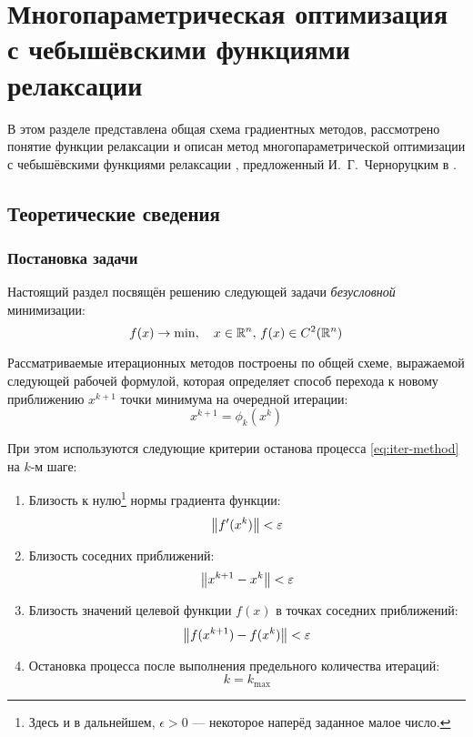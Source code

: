 \section{Многопараметрическая оптимизация\\
  с чебышёвскими функциями релаксации}
\label{sec:relch}

В этом разделе представлена общая схема градиентных методов,
рассмотрено понятие функции релаксации и описан метод
многопараметрической оптимизации с чебышёвскими функциями релаксации
\relch{}, предложенный И. Г. Черноруцким в
\cite{chernorutsky04}.

\subsection{Теоретические сведения}

\subsubsection{Постановка задачи}

Настоящий раздел посвящён решению следующей задачи \emph{безусловной}
минимизации:
\begin{equation}
  \label{eq:optim-problem-form}
  f(x) \to \min,\quad x \in \mathbb{R}^n,\, f(x) \in C^2(\mathbb{R}^n)
\end{equation}

Рассматриваемые итерационных методов построены по общей схеме,
выражаемой следующей рабочей формулой, которая определяет способ
перехода к новому приближению $x^{k+1}$ точки минимума на очередной
итерации:
\begin{equation}
  \label{eq:iter-method}
  x^{k+1} = \phi_k(x^k)
\end{equation}

При этом используются следующие критерии останова процесса
\eqref{eq:iter-method} на $k$-м шаге:
\begin{enumerate}
\item Близость к нулю\footnote{Здесь и в дальнейшем, $\epsilon>0$ —
    некоторое наперёд заданное малое число.} нормы градиента функции:
  \begin{equation*}
  \left \lVert{f'(x^k)}\right \rVert < \varepsilon
\end{equation*}

\item Близость соседних приближений:
  \begin{equation*}
    \left \lVert{x^{k+1}-x^k}\right \rVert < \varepsilon
  \end{equation*}
  
\item Близость значений целевой функции $f(x)$ в точках соседних
  приближений:
  \begin{equation*}
    \left \lVert{f(x^{k+1}) - f(x^k)}\right \rVert < \varepsilon
  \end{equation*}
\item Остановка процесса после выполнения предельного количества
  итераций:
  \begin{equation*}
    k = k_{\max}
  \end{equation*}
  
\end{enumerate}

